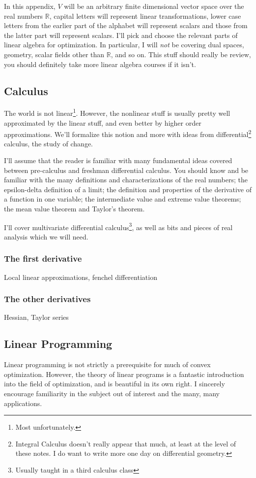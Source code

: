 \documentclass{article}
\numberwithin{equation}{section}
\theoremstyle{definition}
\newcommand{\bR}{\mathbb{R}}
\begin{document}
In this appendix, $V$ will be an arbitrary finite dimensional vector space over the real numbers $\bR$, capital letters will represent linear transformations, lower case letters from the earlier part of the alphabet will represent scalars and those from the latter part will represent scalars. I'll pick and choose the relevant parts of linear algebra for optimization. In particular, I will \textit{not} be covering dual spaces, geometry, scalar fields other than $\bR$, and so on. This stuff should really be review, you should definitely take more linear algebra courses if it isn't.
\subsection{Calculus}
The world is not linear\footnote{Most unfortunately.}. However, the nonlinear stuff is usually pretty well approximated by the linear stuff, and even better by higher order approximations. We'll formalize this notion and more with ideas from differential\footnote{Integral Calculus doesn't really appear that much, at least at the level of these notes. I do want to write more one day on differential geometry.} calculus, the study of change.

I'll assume that the reader is familiar with many fundamental ideas covered between pre-calculus and freshman differential calculus. You should know and be familiar with the many definitions and characterizations of the real numbers; the epsilon-delta definition of a limit; the definition and properties of the derivative of a function in one variable; the intermediate value and extreme value theorems; the mean value theorem and Taylor's theorem.

I'll cover multivariate differential calculus\footnote{Usually taught in a third calculus class}, as well as bits and pieces of real analysis which we will need.
\subsubsection{The first derivative}
Local linear approximations, fenchel differentiation
\subsubsection{The other derivatives}
Hessian, Taylor series
\subsection{Linear Programming}
Linear programming is not strictly a prerequisite for much of convex optimization. However, the theory of linear programs is a fantastic introduction into the field of optimization, and is beautiful in its own right. I sincerely encourage familiarity in the subject out of interest and the many, many applications.
\end{document}
